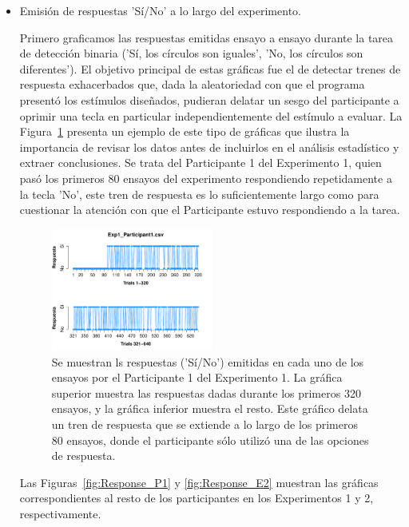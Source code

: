 \begin{itemize}
\item Emisión de respuestas 'Sí/No' a lo largo del experimento.

Primero graficamos las respuestas emitidas ensayo a ensayo durante la tarea de detección binaria ('Sí, los círculos son iguales', 'No, los círculos son diferentes'). El objetivo principal de estas gráficas fue el de detectar trenes de respuesta exhacerbados que, dada la aleatoriedad con que el programa presentó los estímulos diseñados, pudieran delatar un sesgo del participante a oprimir una tecla en particular independientemente del estímulo a evaluar. La Figura~\ref{fig:Resp_E1_P1} presenta un ejemplo de este tipo de gráficas que ilustra la importancia de revisar los datos antes de incluirlos en el análisis estadístico y extraer conclusiones. Se trata del Participante 1 del Experimento 1, quien pasó los primeros 80 ensayos del experimento respondiendo repetidamente a la tecla 'No', este tren de respuesta es lo suficientemente largo como para cuestionar la atención con que el Participante estuvo respondiendo a la tarea.\\ 

\begin{figure}[th]
\centering
\includegraphics[width=0.50\textwidth]{Figures/Response_Exp1_P1} 
\caption[Respuesta emitida por ensayo; ejemplo de participante sesgado]{Se muestran ls respuestas ('Sí/No') emitidas en cada uno de los ensayos por el Participante 1 del Experimento 1. La gráfica superior muestra las respuestas dadas durante los primeros 320 ensayos, y la gráfica inferior muestra el resto. Este gráfico delata un tren de respuesta que se extiende a lo largo de los primeros 80 ensayos, donde el participante sólo utilizó una de las opciones de respuesta.}
\label{fig:Resp_E1_P1}
\end{figure}

Las Figuras~\ref{fig:Response_P1} y \ref{fig:Response_E2} muestran las gráficas correspondientes al resto de los participantes en los Experimentos 1 y 2, respectivamente.\\


\end{itemize}
